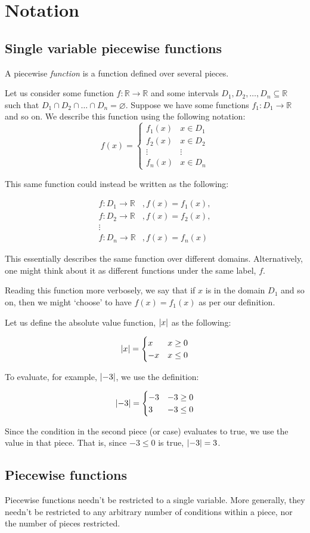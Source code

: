 \section{Notation}
\subsection{Single variable piecewise functions}
A piecewise \textit{function} is a function defined over several pieces. 

Let us consider some function $f:\mathbb{R}\to\mathbb{R}$ and some intervals ${D_1,D_2,\dots,D_n\subseteq\mathbb{R}}$ such that ${D_1\cap D_2\cap \dots\cap D_n=\varnothing}$. Suppose we have some functions $f_1: D_1\to\mathbb{R}$ and so on. We describe this function using the following notation:
$$
    f(x) = \begin{cases} 
        f_1(x) & x\in D_1 \\
        f_2(x) & x\in D_2 \\
        \vdots & \vdots \\
        f_n(x) & x\in D_n
    \end{cases}
$$

This same function could instead be written as the following:

\begin{align*}
    f:D_1\to\mathbb{R}&, f(x)=f_1(x), \\
    f:D_2\to\mathbb{R}&, f(x)=f_2(x), \\
    \vdots \\
    f:D_n\to\mathbb{R}&, f(x)=f_n(x)
\end{align*}

This essentially describes the same function over different domains. Alternatively, one might think about it as different functions under the same label, $f$.

Reading this function more verbosely, we say that if $x$ is in the domain $D_1$ and so on, then we might `choose' to have $f(x)=f_1(x)$ as per our definition.

\begin{example}
    Let us define the absolute value function, $\abs{x}$ as the following:

    $$
        \abs{x} = \begin{cases}
            x & x\geq 0 \\
            -x & x\leq 0
        \end{cases}
    $$

    To evaluate, for example, $\abs{-3}$, we use the definition:

    $$
        \abs{-3} = \begin{cases}
            -3 & -3\geq 0 \\
            3 & -3\leq 0
        \end{cases}
    $$

    Since the condition in the second piece (or case) evaluates to true, we use the value in that piece. That is, since $-3\leq 0$ is true, $\abs{-3}=3$.
\end{example}

\subsection{Piecewise functions}
Piecewise functions needn't be restricted to a single variable. More generally, they needn't be restricted to any arbitrary number of conditions within a piece, nor the number of pieces restricted.

\newpage{}